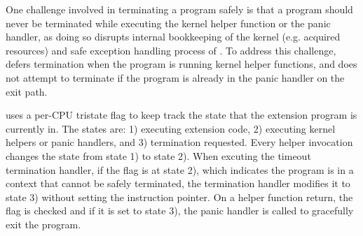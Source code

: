 One challenge involved in terminating a \projname{} program safely is that a
    program should never be terminated while executing the kernel helper
    function or the panic handler, as doing so disrupts internal bookkeeping of
    the kernel (e.g. acquired resources) and safe exception handling process of
    \projname{}.
To address this challenge, \projname{} defers termination when the program is
    running kernel helper functions, and does not attempt to terminate if the
    program is already in the panic handler on the exit path.


\projname{} uses a per-CPU tristate flag to keep track the state that the
    extension program is currently in. %
The states are: 1) executing extension code, 2) executing kernel helpers or
    panic handlers, and 3) termination requested.
Every helper invocation changes the state from state 1) to state 2).
When excuting the timeout termination handler, if the flag is at state 2),
    which indicates the program is in a context that cannot be safely
    terminated, the termination handler modifies it to state 3) without
    setting the instruction pointer.
On a helper function return, the flag is checked and if it is set to state 3),
    the panic handler is called to gracefully exit the program.
